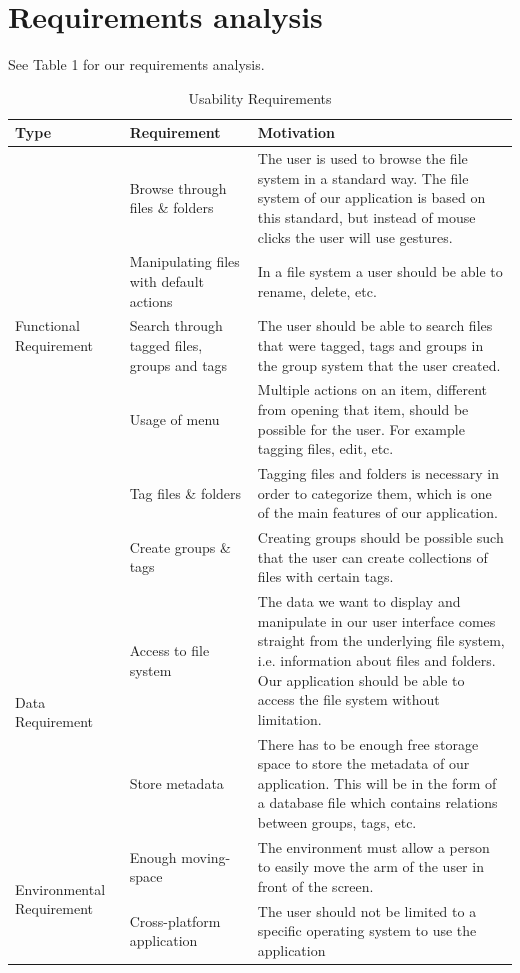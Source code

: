 \documentclass{article}
\begin{document}
\section{Requirements analysis}
See Table 1 for our requirements analysis.

\begin{table}
	\centering
	\captionsetup{justification=centering}
   	\caption{Usability Requirements}
    \begin{tabular}{ | l | l | p{10cm} |}
    \hline
    Type & Requirement & Motivation 
		\\ \hline
		
    \multirow{5}{*}{Functional Requirement} 
		& Browse through files \& folders & The user is used to browse the file system in a standard way. The file system of our application is based on this standard, but instead of mouse clicks the user will use gestures.
		\\ \cline{2-3}
		& Manipulating files with default actions & In a file system a user should be able to rename, delete, etc.
		\\ \cline{2-3}
		& Search through tagged files, groups and tags & The user should be able to search files that were tagged, tags and groups in the group system that the user created.
		\\ \cline{2-3}		
		& Usage of menu & Multiple actions on an item, different from opening that item, should be possible for the user. For example tagging files, edit, etc.
		\\ \cline{2-3}
		& Tag files \& folders & Tagging files and folders is necessary in order to categorize them, which is one of the main features of our application.
		\\ \cline{2-3}
		& Create groups \& tags & Creating groups should be possible such that the user can create collections of files with certain tags.
		\\ \hline	
			
		
    \multirow{2}{*}{Data Requirement} & Access to file system & The data we want to display and manipulate in our user interface comes straight from the underlying file system, i.e. information about files and folders. Our application should be able to access the file system without limitation. 
		\\ \cline{2-3}
		& Store metadata & There has to be enough free storage space to store the metadata of our application. This will be in the form of a database file which contains relations between groups, tags, etc.
		\\ \hline

    \multirow{2}{*}{Environmental Requirement} & Enough moving-space & The environment must allow a person to easily move the arm of the user in front of the screen.
			\\ \cline{2-3}
		& Cross-platform application & The user should not be limited to a specific operating system to use the application
		\\ \hline
    \end{tabular}
\end{table}
\end{document}
